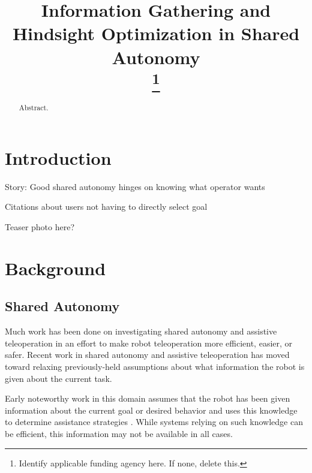 \documentclass[conference]{IEEEtran}
\begin{document}
\title{Information Gathering and Hindsight Optimization in Shared Autonomy\\
\thanks{Identify applicable funding agency here. If none, delete this.}
}

\author{
\and
{}
}

\maketitle

\begin{abstract}
Abstract.
\end{abstract}

\section{Introduction}

Story: Good shared autonomy hinges on knowing what operator wants

Citations about users not having to directly select goal

Teaser photo here?

\section{Background}
\subsection{Shared Autonomy}

Much work has been done on investigating shared autonomy and assistive teleoperation in an effort to make robot teleoperation more efficient, easier, or safer. Recent work in shared autonomy and assistive teleoperation has moved toward relaxing previously-held assumptions about what information the robot is given about the current task. 

Early noteworthy work in this domain assumes that the robot has been given information about the current goal or desired behavior and uses this knowledge to determine assistance strategies \cite{aigner1997human, debus2001cooperative, goodrich2001experiments}. While systems relying on such knowledge can be efficient, this information may not be available in all cases.
\end{document}
